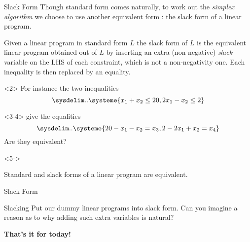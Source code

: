 \documentclass[aspectratio = 169]{beamer}
\begin{document}
\begin{frame}{Slack Form}
  Though standard form comes naturally, to work out the \emph{simplex
    algorithm} we choose to use another equivalent form : the slack
  form of a linear program.
  \begin{defn}
    Given a linear program in standard form $L$ the slack form of $L$
    is the equivalent linear program obtained out of $L$ by inserting
    an extra (non-negative) \emph{slack} variable on the LHS of each
    constraint, which is not a non-negativity one. Each inequality is
    then replaced by an equality.
  \end{defn}
  \vspace{1em}
  \begin{overlayarea}{\textwidth}{.35\textheight}
    \begin{onlyenv}<2>
      For instance the two inequalities
      \[
      \sysdelim..\systeme{x_1 + x_2 \leq 20, 2x_1 - x_2 \leq 2}
      \]
    \end{onlyenv}
    \begin{onlyenv}<3-4>
      give the equalities
      \[
      \sysdelim..\systeme{20 - x_1 - x_2 = x_3, 2 - 2x_1 + x_2 = x_4 }
      \]
      \pause[4] Are they equivalent?
    \end{onlyenv}
    \begin{onlyenv}<5->
      \vspace{-\baselineskip}
      \begin{prop}
        Standard and slack forms of a linear program are equivalent.
      \end{prop}
    \end{onlyenv}
  \end{overlayarea}
\end{frame}

\begin{frame}{Slack Form}
  \begin{halfshyblock}{Slacking}
    Put our dummy linear programs into slack form. Can you imagine a
    reason as to why adding such extra variables is natural?
  \end{halfshyblock}
\end{frame}

\begin{frame}
  \begin{center}
    {\huge \textbf{That's it for today!}}
   \end{center}
 \end{frame}

\end{document}
